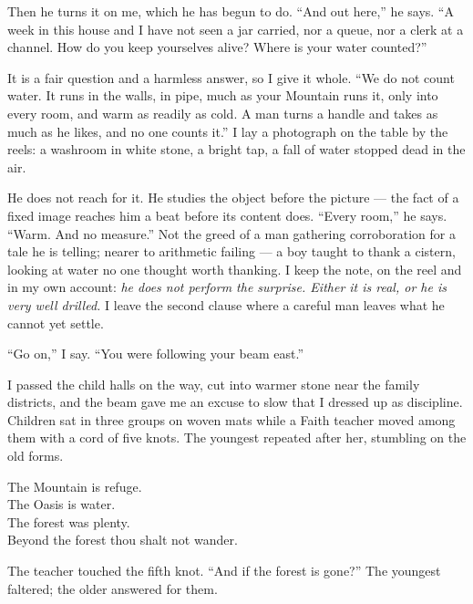 Then he turns it on me, which he has begun to do. ``And out here,'' he says. ``A week in this house and I have not seen a jar carried, nor a queue, nor a clerk at a channel. How do you keep yourselves alive? Where is your water counted?''\par

It is a fair question and a harmless answer, so I give it whole. ``We do not count water. It runs in the walls, in pipe, much as your Mountain runs it, only into every room, and warm as readily as cold. A man turns a handle and takes as much as he likes, and no one counts it.'' I lay a photograph on the table by the reels: a washroom in white stone, a bright tap, a fall of water stopped dead in the air.\par

He does not reach for it. He studies the object before the picture --- the fact of a fixed image reaches him a beat before its content does. ``Every room,'' he says. ``Warm. And no measure.'' Not the greed of a man gathering corroboration for a tale he is telling; nearer to arithmetic failing --- a boy taught to thank a cistern, looking at water no one thought worth thanking. I keep the note, on the reel and in my own account: \textit{he does not perform the surprise. Either it is real, or he is very well drilled.} I leave the second clause where a careful man leaves what he cannot yet settle.\par

``Go on,'' I say. ``You were following your beam east.''\par

\ornament

\noindent I passed the child halls on the way, cut into warmer stone near the family districts, and the beam gave me an excuse to slow that I dressed up as discipline. Children sat in three groups on woven mats while a Faith teacher moved among them with a cord of five knots. The youngest repeated after her, stumbling on the old forms.\par

\begin{scripture}
The Mountain is refuge. \\
The Oasis is water. \\
The forest was plenty. \\
Beyond the forest thou shalt not wander.
\end{scripture}

The teacher touched the fifth knot. ``And if the forest is gone?'' The youngest faltered; the older answered for them.\par

